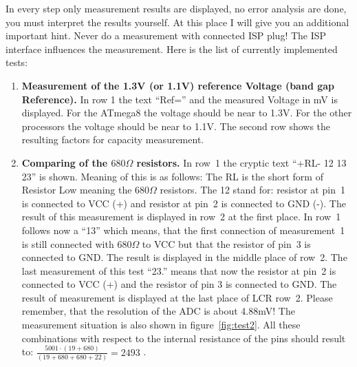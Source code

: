 In every step only measurement results are displayed, no error analysis are done, you must interpret the results yourself.
At this place I will give you an additional important hint. Never do a measurement with connected ISP plug!
The ISP interface influences the measurement. 
\vspace{1cm}
Here is the list of currently implemented tests:
\vspace{1cm}
\begin{enumerate}
\item {\bf Measurement of the 1.3V (or 1.1V) reference Voltage (band gap Reference).}
In row 1 the text ``Ref='' and the measured Voltage in mV is displayed.
For the ATmega8 the voltage should be near to 1.3V. For the other processors the voltage should be near to 1.1V.
The second row shows the resulting factors for capacity measurement.
\item {\bf Comparing of the  \(680\Omega\) resistors.}
In row~1 the cryptic text  ``+RL- 12 13 23'' is shown. Meaning of this is as follows: 
The RL is the short form of Resistor Low meaning the \(680\Omega\) resistors. The 12 stand for: 
resistor at pin~1 is connected to VCC (+) and resistor at pin~2 is connected to GND (-). 
The result of this measurement  is displayed in row~2 at the first place. 
 In row~1 follows now a ``13'' which means, that the first connection of measurement~1 is still connected
with \(680\Omega\) to VCC but that the resistor of pin~3 is connected to GND.
The result is displayed in the middle place of row~2. 
The last measurement of this test ``23.'' means that now the resistor at pin~2 is connected to VCC (+) and
the resistor of pin 3 is connected to GND. The result of measurement is displayed at the last place of LCR row~2.
Please remember, that the resolution of the ADC is about 4.88mV!
The measurement situation is also shown in figure~\ref{fig:test2}.
All these combinations with respect to the internal resistance of the pins should result to: 
\(\frac{5001 \cdot  (19+680)}{ (19+680+680+22)} = 2493\) .


\end{enumerate}
